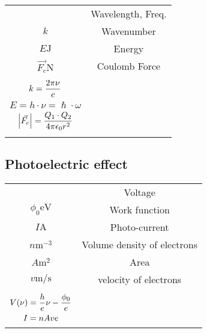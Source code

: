 \documentclass{article}
\begin{document}
\begin{twocolumn}
\begin{donotbrake}
\begin{tabular}{cc}
	\begin{dtabular}
		$\lambda \si{\meter}, \, \nu\si{\per\second}$ & Wavelength, Freq. \\
		$k$ & Wavenumber \\
		$E \si{\joule}$ & Energy \\
		$\vec{F_c} \si{\newton}$ & Coulomb Force \\
	\end{dtabular} &
	\begin{mtabular}{c}
		$\fmm \lambda = \frac{c}{\nu} \quad \fmm \nu = \frac{c}{\lambda} \quad \omega = 2 \pi \nu$ \\
		$\displaystyle k = \frac{2 \pi \nu}{c}$ \\
		$E = h \cdot \nu = \hslash \cdot \omega$ \\
		$\displaystyle \left| \vec{F_c} \right| = \frac{Q_1 \cdot Q_2}{4 \pi \epsilon_0 r^2}$ \\
	\end{mtabular}
\end{tabular}

\end{donotbrake}


\begin{donotbrake}
\subsection{Photoelectric effect}

\begin{tabular}{cc}
	\begin{dtabular}
		$V \si{\volt}$ & Voltage \\
		$\phi_0 \si{\electronvolt} $ & Work function \\
		$I \si{\ampere}$ & Photo-current \\
		$n \si{\metre^{-3}}$ & Volume density of electrons \\
		$A \si{\metre \squared}$ & Area \\
		$v \si{\metre \per \second}$ & velocity of electrons \\	
	\end{dtabular} &
	\begin{mtabular}{c}
		$\fmm h \nu - \phi_0 = \frac{1}{2} m v^2 = eV$ \\
		$\displaystyle V(\nu) =  \frac{h}{e} \nu - \frac{\phi_0}{e}$ \\
		$\displaystyle I = n A v e$ \\
	\end{mtabular}
\end{tabular}
\end{donotbrake}



\end{twocolumn}
\end{document}
